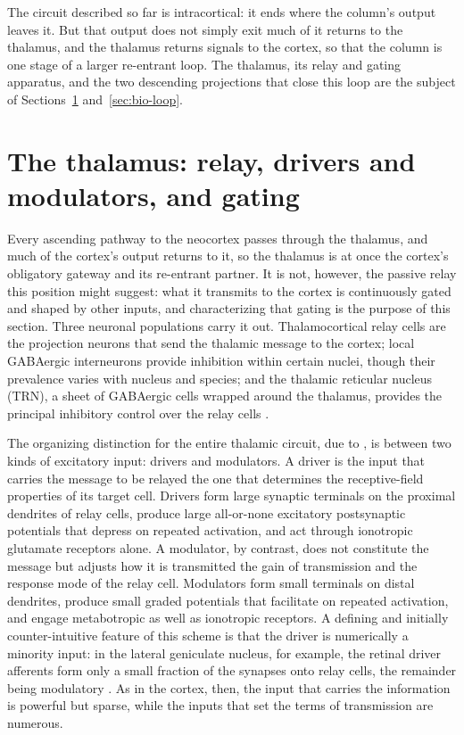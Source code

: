 The circuit described so far is intracortical: it ends where the column's output leaves it. But that output does not simply exit much of it returns to the thalamus, and the thalamus returns signals to the cortex, so that the column is one stage of a larger re-entrant loop. The thalamus, its relay and gating apparatus, and the two descending projections that close this loop are the subject of Sections~\ref{sec:bio-thalamus} and~\ref{sec:bio-loop}.

\section{The thalamus: relay, drivers and modulators, and gating}
\label{sec:bio-thalamus}

Every ascending pathway to the neocortex passes through the thalamus, and much of the cortex's output returns to it, so the thalamus is at once the cortex's obligatory gateway and its re-entrant partner. It is not, however, the passive relay this position might suggest: what it transmits to the cortex is continuously gated and shaped by other inputs, and characterizing that gating is the purpose of this section. Three neuronal populations carry it out. Thalamocortical relay cells are the projection neurons that send the thalamic message to the cortex; local GABAergic interneurons provide inhibition within certain nuclei, though their prevalence varies with nucleus and species; and the thalamic reticular nucleus (TRN), a sheet of GABAergic cells wrapped around the thalamus, provides the principal inhibitory control over the relay cells \parencite{sherman2013, shepherd2018}.

The organizing distinction for the entire thalamic circuit, due to \textcite{sherman1998}, is between two kinds of excitatory input: drivers and modulators. A driver is the input that carries the message to be relayed the one that determines the receptive-field properties of its target cell. Drivers form large synaptic terminals on the proximal dendrites of relay cells, produce large all-or-none excitatory postsynaptic potentials that depress on repeated activation, and act through ionotropic glutamate receptors alone. A modulator, by contrast, does not constitute the message but adjusts how it is transmitted  the gain of transmission and the response mode of the relay cell. Modulators form small terminals on distal dendrites, produce small graded potentials that facilitate on repeated activation, and engage metabotropic as well as ionotropic receptors. A defining and initially counter-intuitive feature of this scheme is that the driver is numerically a minority input: in the lateral geniculate nucleus, for example, the retinal driver afferents form only a small fraction of the synapses onto relay cells, the remainder being modulatory \parencite{sherman1998, sherman2013}. As in the cortex, then, the input that carries the information is powerful but sparse, while the inputs that set the terms of transmission are numerous.

